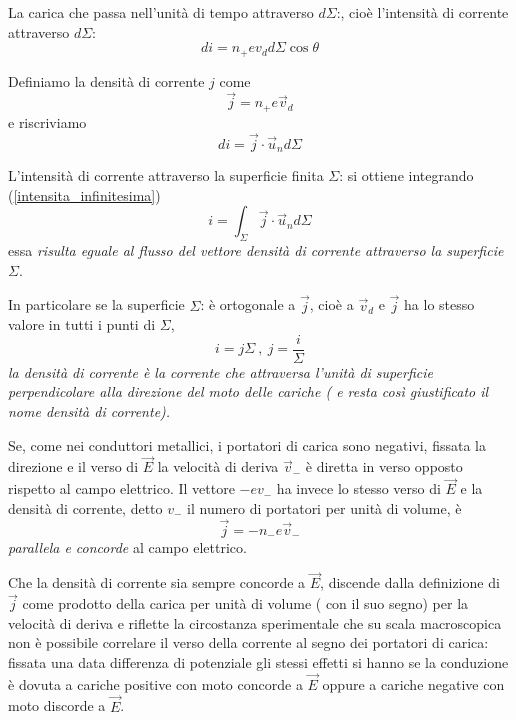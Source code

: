\documentclass[class=book, crop=false, oneside, 12pt]{standalone}
\begin{document}
La carica che passa nell'unità di tempo attraverso \(d \Sigma\):, cioè l'intensità di corrente attraverso \(d \Sigma\):
\begin{equation*}
    di = n_{+} e v_d d \Sigma \cos \theta
\end{equation*}

Definiamo la densità di corrente \(j\) come
\begin{equation}
    \overrightarrow{j} = n_{+} e \overrightarrow{v}_d
\end{equation}
e riscriviamo 
\begin{equation} \label{intensita_infinitesima}
    di = \overrightarrow{j} \cdot \overrightarrow{u}_n d \Sigma
\end{equation}

L'intensità di corrente attraverso la superficie finita \(\Sigma\): si ottiene integrando (\ref{intensita_infinitesima})
\begin{equation} \label{intensita_di_corrente}
    i = \int_{\Sigma} \overrightarrow{j} \cdot \overrightarrow{u}_n d \Sigma
\end{equation}
essa \emph{risulta eguale al flusso del vettore densità di corrente attraverso la superficie} \(\Sigma\).

In particolare se la superficie \(\Sigma\): è ortogonale a \(\overrightarrow{j}\), cioè a \(\overrightarrow{v}_d\) e \(\overrightarrow{j}\) ha lo stesso valore in tutti i punti di \(\Sigma\),
\begin{equation}
    i = j \Sigma \ , \ j = \frac{i}{\Sigma}
\end{equation}
\emph{la densità di corrente è la corrente che attraversa l'unità di superficie perpendicolare alla direzione del moto delle cariche ( e resta così giustificato il nome densità di corrente). }

Se, come nei conduttori metallici, i portatori di carica sono negativi, fissata la direzione e il verso di \(\overrightarrow{E}\) la velocità di deriva \(\overrightarrow{v}_{-}\) è diretta in verso opposto rispetto al campo elettrico. 
Il vettore \(-e v_{-}\) ha invece lo stesso verso di \(\overrightarrow{E}\) e la densità di corrente, detto \(v_{-}\) il numero di portatori per unità di volume, è
\begin{equation}
    \overrightarrow{j} = -n_{-} e \overrightarrow{v}_{-}
\end{equation}
\emph{parallela e concorde } al campo elettrico.

Che la densità di corrente sia sempre concorde a \(\overrightarrow{E}\), discende dalla definizione di \(\overrightarrow{j}\) come prodotto della carica per unità di volume ( con il suo segno) per la velocità di deriva e riflette la circostanza sperimentale che su scala macroscopica non è possibile correlare il verso della corrente al segno dei portatori di carica: fissata una data differenza di potenziale gli stessi effetti si hanno se la conduzione è dovuta a cariche positive con moto concorde a \(\overrightarrow{E}\) oppure a cariche negative con moto discorde a \(\overrightarrow{E}\). 
\end{document}
